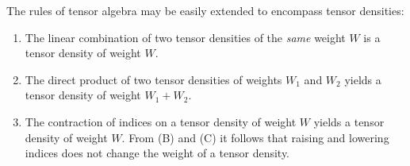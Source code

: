 The rules of tensor algebra may be easily extended to encompass tensor
densities:

\begin{enumerate}
  \item[(A)] The linear combination of two tensor densities of the
  \textit{same} weight \(W\) is a tensor density of weight \(W\).

  \item[(B)] The direct product of two tensor densities of weights \(W_1\)
  and \(W_2\) yields a tensor density of weight \(W_1+W_2\).

  \item[(C)] The contraction of indices on a tensor density of weight \(W\)
  yields a tensor density of weight \(W\). From (B) and (C) it follows that
  raising and lowering indices does not change the weight of a tensor
  density.
\end{enumerate}
